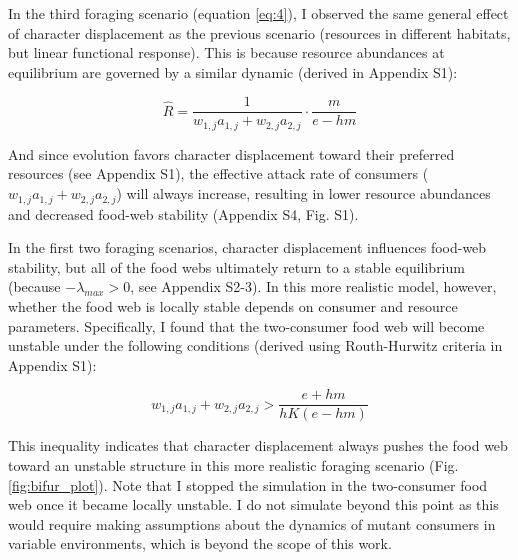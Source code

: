 \documentclass[11pt,]{article}
\begin{document}
In the third foraging scenario (equation \ref{eq:4}), I observed the
same general effect of character displacement as the previous scenario
(resources in different habitats, but linear functional response). This
is because resource abundances at equilibrium are governed by a similar
dynamic (derived in Appendix S1):

\begin{equation} \label{eq:7}
  \hat{R}=\frac{1}{w_{1,j}a_{1,j}+w_{2,j}a_{2,j}}\cdot\frac{m}{e-hm}
\end{equation}

And since evolution favors character displacement toward their preferred
resources (see Appendix S1), the effective attack rate of consumers
(\(w_{1,j}a_{1,j}+w_{2,j}a_{2,j}\)) will always increase, resulting in
lower resource abundances and decreased food-web stability (Appendix S4,
Fig. S1).

In the first two foraging scenarios, character displacement influences
food-web stability, but all of the food webs ultimately return to a
stable equilibrium (because \(-\lambda_{max}>0\), see Appendix S2-3). In
this more realistic model, however, whether the food web is locally
stable depends on consumer and resource parameters. Specifically, I
found that the two-consumer food web will become unstable under the
following conditions (derived using Routh-Hurwitz criteria in Appendix
S1):

\begin{equation} \label{eq:8}
  w_{1,j}a_{1,j}+w_{2,j}a_{2,j} > \frac{e+hm}{hK(e-hm)}
\end{equation}

This inequality indicates that character displacement always pushes the
food web toward an unstable structure in this more realistic foraging
scenario (Fig. \ref{fig:bifur_plot}). Note that I stopped the simulation
in the two-consumer food web once it became locally unstable. I do not
simulate beyond this point as this would require making assumptions
about the dynamics of mutant consumers in variable environments, which
is beyond the scope of this work.
\end{document}
